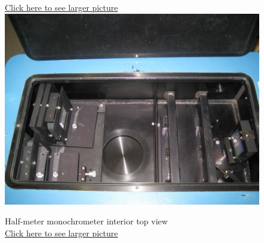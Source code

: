 \documentclass{../lab}
\begin{document}
\begin{figure}[!h]
{  \href{http://experimentationlab.berkeley.edu/sites/default/files/images/ATM_ZeemanSetup_3492-Crop-Lg.jpg}{Click here to see larger picture}}
  \label{fig:ZeemanApparatus}
\endminipage\hfill
{}
  \href{http://experimentationlab.berkeley.edu/sites/default/files/images/ATM-mono-In-Topview_3501-Lg.jpg}{\includegraphics[width=\linewidth,keepaspectratio]{images/ATM-mono-In-Topview_3501-Lg.jpg}}
  \caption{Half-meter monochrometer interior top view\\ \href{http://experimentationlab.berkeley.edu/sites/default/files/images/ATM-mono-In-Topview_3501-Lg.jpg}{Click here to see larger picture}}\label{fig:MonochrometerInteriorTop}
\endminipage
\end{figure}
\end{document}

